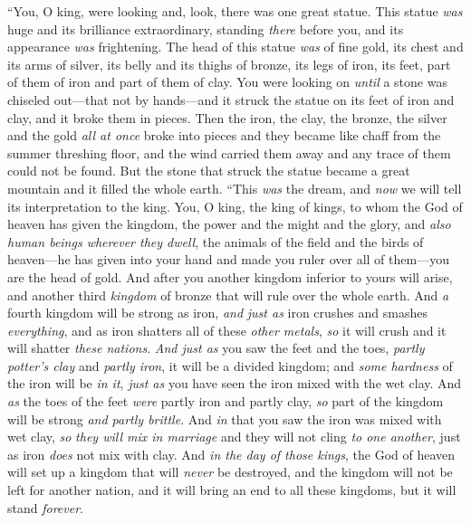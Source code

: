 \begin{biblechapter}
\verse “You, O king, were looking and, look, there was one great statue. This statue \textit{was} huge and its brilliance extraordinary, standing \textit{there} before you, and its appearance \textit{was} frightening.
\verse The head of this statue \textit{was} of fine gold, its chest and its arms of silver, its belly and its thighs of bronze,
\verse its legs of iron, its feet, part of them of iron and part of them of clay.
\verse You were looking on \textit{until} a stone was chiseled out—that not by hands—and it struck the statue on its feet of iron and clay, and it broke them in pieces.
\verse Then the iron, the clay, the bronze, the silver and the gold \textit{all at once} broke into pieces and they became like chaff from the summer threshing floor, and the wind carried them away and any trace of them could not be found. But the stone that struck the statue became a great mountain and it filled the whole earth.
\verse “This \textit{was} the dream, and \textit{now} we will tell its interpretation to the king.
\verse You, O king, the king of kings, to whom the God of heaven has given the kingdom, the power and the might and the glory,
\verse and \textit{also} \textit{human beings wherever they dwell}, the animals of the field and the birds of heaven—he has given into your hand and made you ruler over all of them—you are the head of gold.
\verse And after you another kingdom inferior to yours will arise, and another third \textit{kingdom} of bronze that will rule over the whole earth.
\verse And \textit{a} fourth kingdom will be strong as iron, \textit{and} \textit{just as} iron crushes and smashes \textit{everything}, and as iron shatters all of these \textit{other metals}, \textit{so} it will crush and it will shatter \textit{these nations}.
\verse \textit{And just as} you saw the feet and the toes, \textit{partly potter’s clay} and \textit{partly iron}, it will be a divided kingdom; and \textit{some hardness} of the iron will be \textit{in it}, \textit{just as} you have seen the iron mixed with the wet clay.
\verse And \textit{as} the toes of the feet \textit{were} partly iron and partly clay, \textit{so} part of the kingdom will be strong \textit{and partly brittle}.
\verse And \textit{in} that you saw the iron was mixed with wet clay, \textit{so} \textit{they will mix in marriage} and they will not cling \textit{to one another}, just as iron \textit{does} not mix with clay.
\verse And \textit{in the day of those kings}, the God of heaven will set up a kingdom that will \textit{never} be destroyed, and the kingdom will not be left for another nation, and it will bring an end to all these kingdoms, but it will stand \textit{forever}.

\end{biblechapter}

